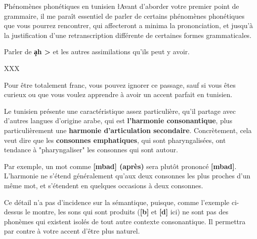 
\h{Phénomènes phonétiques en tunisien}
\l{A}vant d'aborder votre premier point de grammaire, il me paraît essentiel de parler de certains phénomènes phonétiques que vous pourrez rencontrer, qui affecteront a minima la prononciation, et jusqu'à la justification d'une retranscription différente de certaines formes grammaticales.

\label{Assimilation}
Parler de \textbf{\c{a}h > \textcrh\textcrh} et les autres assimilations qu'ils peut y avoir.

XXX

Pour être totalement franc, vous pouvez ignorer ce passage, sauf si vous êtes curieux ou que vous voulez apprendre à avoir un accent parfait en tunisien. 

Le tunisien présente une caractéristique assez particulière, qu'il partage avec d'autres langues d'origine arabe, qui est \textbf{l'harmonie consonantique}, plus particulièrement une \textbf{harmonie d'articulation secondaire}. Concrètement, cela veut dire que les \textbf{consonnes emphatiques}, qui sont pharyngalisées, ont tendance à "pharyngaliser" les consonnes qui sont autour. 

Par exemple, un mot comme \textbf{[mba\textrevglotstop \textschwa d] (après)} sera plutôt prononcé \textbf{[mb\super\textrevglotstop a\textrevglotstop \textschwa d\super\textrevglotstop]}. L'harmonie ne s'étend généralement qu'aux deux consonnes les plus proches d'un même mot, et s'étendent en quelques occasions à deux consonnes.

Ce détail n'a pas d'incidence sur la sémantique, puisque, comme l'exemple ci-dessus le montre, les sons qui sont produits (\textbf{[b\super\textrevglotstop]} et \textbf{[d\super\textrevglotstop]} ici) ne sont pas des phonèmes qui existent isolés de tout autre contexte consonantique. Il permettra par contre à votre accent d'être plus naturel.
